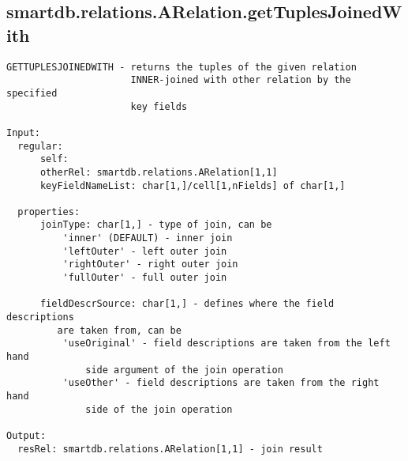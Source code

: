 \subsection{\texorpdfstring{smartdb.relations.ARelation.getTuplesJoinedWith}{getTuplesJoinedWith}}\label{method:smartdb.relations.ARelation.getTuplesJoinedWith}
\begin{verbatim}
GETTUPLESJOINEDWITH - returns the tuples of the given relation
                      INNER-joined with other relation by the specified
                      key fields

Input:
  regular:
      self:
      otherRel: smartdb.relations.ARelation[1,1]
      keyFieldNameList: char[1,]/cell[1,nFields] of char[1,]

  properties:
      joinType: char[1,] - type of join, can be
          'inner' (DEFAULT) - inner join
          'leftOuter' - left outer join
          'rightOuter' - right outer join
          'fullOuter' - full outer join

      fieldDescrSource: char[1,] - defines where the field descriptions
         are taken from, can be
          'useOriginal' - field descriptions are taken from the left hand
              side argument of the join operation
          'useOther' - field descriptions are taken from the right hand
              side of the join operation

Output:
  resRel: smartdb.relations.ARelation[1,1] - join result
\end{verbatim}
